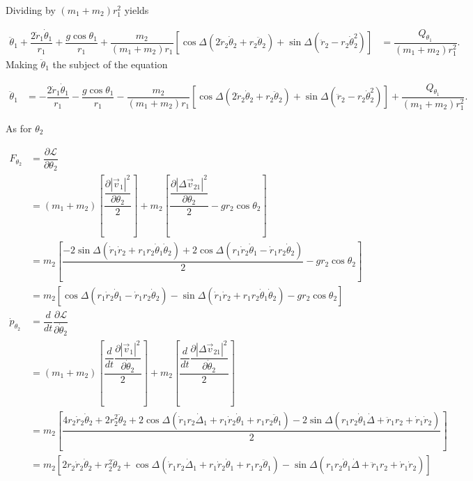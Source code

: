 \documentclass[12pt,a4paper,portrait]{article}
\newcommand{\lag}{\mathcal{L}}
\begin{document}
\begin{landscape}
Dividing by $(m_1+m_2)r_1^2$ yields

\begin{align*}
	\ddot{\theta}_1 + \dfrac{2\dot{r}_1\dot{\theta}_1}{r_1} + \dfrac{g\cos{\theta_1}}{r_1} + \dfrac{m_2}{(m_1+m_2)r_1}\left[\cos{\Delta}(2\dot{r}_2\dot{\theta}_2+r_2\ddot{\theta}_2) +\sin{\Delta}(\ddot{r}_2-r_2\dot{\theta}_2^2)\right] &= \dfrac{Q_{\theta_1}}{(m_1+m_2)r_1^2}.
\end{align*}
Making $\ddot{\theta}_1$ the subject of the equation

\begin{align*}
	\ddot{\theta}_1 &= -\dfrac{2\dot{r}_1\dot{\theta}_1}{r_1} - \dfrac{g\cos{\theta_1}}{r_1} - \dfrac{m_2}{(m_1+m_2)r_1}\left[\cos{\Delta}(2\dot{r}_2\dot{\theta}_2+r_2\ddot{\theta}_2) +\sin{\Delta}(\ddot{r}_2-r_2\dot{\theta}_2^2)\right] + \dfrac{Q_{\theta_1}}{(m_1+m_2)r_1^2}.
\end{align*}

As for $\theta_2$

\begin{align*}
	F_{\theta_2} &= \dfrac{\partial \lag}{\partial \theta_2} \\
	&= (m_1+m_2)\left[\dfrac{\dfrac{\partial |\vec{v}_1|^2}{\partial \theta_2}}{2}\right] + m_2\left[\dfrac{\dfrac{\partial |\Delta \vec{v}_{21}|^2}{\partial \theta_2}}{2} - gr_2\cos{\theta_2}\right] \\
	&= m_2 \left[\dfrac{-2\sin{\Delta}(\dot{r}_1\dot{r}_2 + r_1r_2\dot{\theta}_1\dot{\theta}_2) + 2\cos{\Delta}(r_1\dot{r}_2\dot{\theta}_1-\dot{r}_1r_2\dot{\theta}_2)}{2} - gr_2\cos{\theta_2}\right] \\
	&= m_2\left[\cos{\Delta}(r_1\dot{r}_2\dot{\theta}_1-\dot{r}_1r_2\dot{\theta}_2) - \sin{\Delta}(\dot{r}_1\dot{r}_2 + r_1r_2\dot{\theta}_1\dot{\theta}_2) - gr_2\cos{\theta_2}\right]\\
	\dot{p}_{\theta_2} &= \dfrac{d}{dt} \dfrac{\partial \lag}{\partial \dot{\theta}_2} \\
	&= (m_1+m_2)\left[\dfrac{\dfrac{d}{dt}\dfrac{\partial |\vec{v}_1|^2}{\partial \dot{\theta}_2}}{2}\right] + m_2\left[\dfrac{\dfrac{d}{dt}\dfrac{\partial|\Delta \vec{v}_{21}|^2}{\partial \dot{\theta}_2}}{2}\right]\\
	&= m_2 \left[\dfrac{4r_2\dot{r}_2\dot{\theta}_2 + 2r_2^2\ddot{\theta}_2 +2\cos{\Delta}(\dot{r}_1r_2\dot{\Delta}_1+r_1\dot{r}_2\dot{\theta}_1+r_1r_2\ddot{\theta}_1)-2\sin{\Delta}(r_1r_2\dot{\theta}_1\dot{\Delta} + \ddot{r}_1r_2 + \dot{r}_1\dot{r}_2)}{2}\right]\\
	&= m_2\left[2r_2\dot{r}_2\dot{\theta}_2 + r_2^2\ddot{\theta}_2 +\cos{\Delta}(\dot{r}_1r_2\dot{\Delta}_1+r_1\dot{r}_2\dot{\theta}_1+r_1r_2\ddot{\theta}_1)-\sin{\Delta}(r_1r_2\dot{\theta}_1\dot{\Delta} + \ddot{r}_1r_2 + \dot{r}_1\dot{r}_2)\right]
\end{align*}


\end{landscape}
\end{document}
